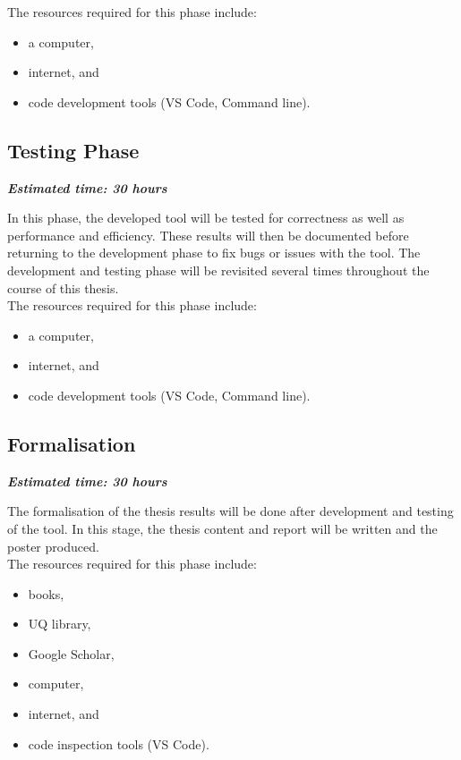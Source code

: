 \documentclass[twocolumn]{article}
\begin{document}
The resources required for this phase include:
\begin{itemize}
    \item a computer,
    \item internet, and
    \item code development tools (VS Code, Command line).
\end{itemize}

\subsection{Testing Phase}
\textbf{\textit{Estimated time: 30 hours}}

In this phase, the developed tool will be tested for correctness as well as performance and efficiency. These results will then be documented before returning to the development phase to fix bugs or issues with the tool. The development and testing phase will be revisited several times throughout the course of this thesis. \\

The resources required for this phase include:
\begin{itemize}
    \item a computer,
    \item internet, and
    \item code development tools (VS Code, Command line).
\end{itemize}

\subsection{Formalisation}
\textbf{\textit{Estimated time: 30 hours}}

The formalisation of the thesis results will be done after development and testing of the tool. In this stage, the thesis content and report will be written and the poster produced. \\

The resources required for this phase include:
\begin{itemize}
    \item books,
    \item UQ library,
    \item Google Scholar,
    \item computer,
    \item internet, and
    \item code inspection tools (VS Code).
\end{itemize}
\end{document}
